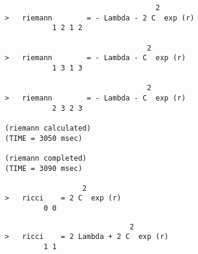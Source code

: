 \begin{verbatim}
                                   2
>   riemann        = - Lambda - 2 C  exp (r)
           1 2 1 2

                                 2
>   riemann        = - Lambda - C  exp (r)
           1 3 1 3

                                 2
>   riemann        = - Lambda - C  exp (r)
           2 3 2 3

(riemann calculated)
(TIME = 3050 msec)

(riemann completed)
(TIME = 3090 msec)

                  2
>   ricci    = 2 C  exp (r)
         0 0

\end{verbatim}
{\samepage
\begin{verbatim}
                             2
>   ricci    = 2 Lambda + 2 C  exp (r)
         1 1
\end{verbatim}
      }
